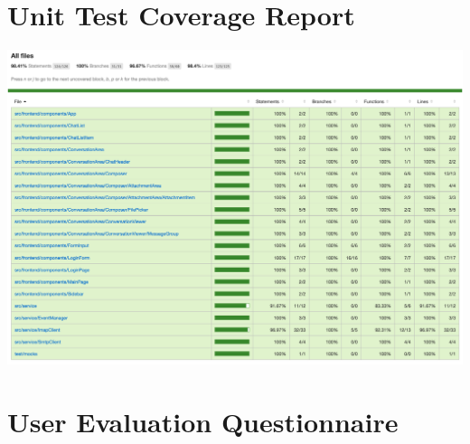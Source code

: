 \begin{appendices}


\chapter{Unit Test Coverage Report}
\label{appendix:coverage}
\includegraphics[width=\linewidth]{images/coverage-report.png}

\chapter{User Evaluation Questionnaire}

\end{appendices}